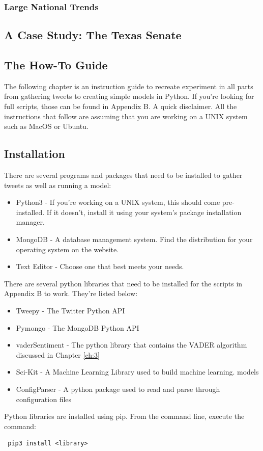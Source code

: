 \documentclass[11pt, twoside, reqno]{book}
\begin{document}
\subsection{Large National Trends}



\section{A Case Study: The Texas Senate}
\begin{appendices}
\chapter{The How-To Guide}
The following chapter is an instruction guide to recreate experiment in all parts from gathering tweets to creating simple models in Python. If you're looking for full scripts, those can be found in Appendix B. A quick disclaimer. All the instructions that follow are assuming that you are working on a UNIX system such as MacOS or Ubuntu.  

\section{Installation}
There are several programs and packages that need to be installed to gather tweets as well as running a model:
\begin{itemize}
	\item Python3 - If you're working on a UNIX system, this should come pre-installed. If it doesn't, install it using your system's package installation manager. 
	\item MongoDB - A database management system. Find the distribution for your operating system on the website. 
	\item Text Editor - Choose one that best meets your needs. 
\end{itemize}
\newpage
There are several python libraries that need to be installed for the scripts in Appendix B to work. They're listed below:
\begin{itemize}
	\item Tweepy - The Twitter Python API
	\item Pymongo - The MongoDB Python API
	\item vaderSentiment - The python library that contains the VADER algorithm discussed in Chapter \ref{ch:3} 
	\item Sci-Kit - A Machine Learning Library used to build machine learning. models
	\item ConfigParser - A python package used to read and parse through configuration files
\end{itemize}
Python libraries are installed using pip. From the command line, execute the command: \begin{verbatim} pip3 install <library> \end{verbatim}


\end{appendices}
\end{document}
